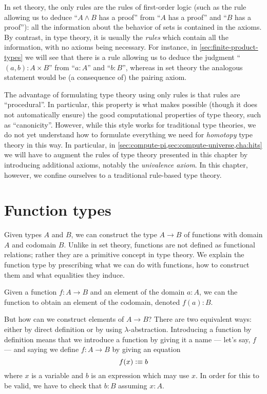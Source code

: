 In set theory, the only rules are the rules of first-order logic (such as the rule allowing us to deduce ``$A\wedge B$ has a proof'' from ``$A$ has a proof'' and ``$B$ has a proof''): all the information about the behavior of sets is contained in the axioms.
By contrast, in type theory, it is usually the \emph{rules} which contain all the information, with no axioms being necessary.
For instance, in \autoref{sec:finite-product-types} we will see that there is a rule allowing us to deduce the judgment ``$(a,b):A\times B$'' from ``$a:A$'' and ``$b:B$'', whereas in set theory the analogous statement would be (a consequence of) the pairing axiom.

The advantage of formulating type theory using only rules is that rules are ``procedural''.
In particular, this property is what makes possible (though it does not automatically ensure) the good computational properties of type theory, such as ``canonicity''.
However, while this style works for traditional type theories, we do not yet understand how to formulate everything we need for \emph{homotopy} type theory in this way.
In particular, in \autoref{sec:compute-pi,sec:compute-universe,cha:hits} we will have to augment the rules of type theory presented in this chapter by introducing additional axioms, notably the \emph{univalence axiom}.
In this chapter, however, we confine ourselves to a traditional rule-based type theory.


\section{Function types}
\label{sec:function-types}

Given types $A$ and $B$, we can construct the type $A \to B$ of functions with domain $A$
and codomain $B$. Unlike in set theory, functions are not defined as
functional relations; rather they are a primitive concept in type theory.
We explain the function type by prescribing what we can do with functions, 
how to construct them and what equalities they induce.

Given a function $f : A \to B$ and an element of the domain $a : A$, we
can  the function to obtain an element of the codomain,
denoted $f(a) : B$. 

But how can we construct elements of $A \to B$? There are two equivalent ways:
either by direct definition or by using
$\lambda$-abstraction. Introducing a function by definition means that
we introduce a function by giving it a name --- let's say, $f$ --- and saying
we define $f : A \to B$ by giving an equation
\begin{equation}
  \label{eq:expldef}
  f(x) \defeq b
\end{equation}
where $x$ is a variable and $b$ is an expression which may use $x$.
In order for this to be valid, we have to check that $b : B$ assuming $x:A$.

